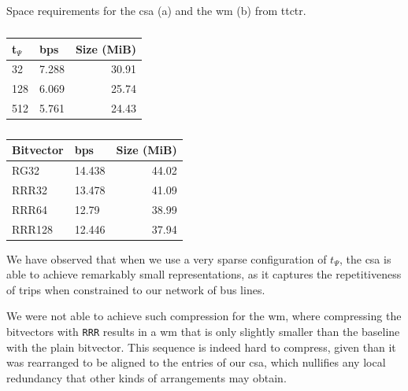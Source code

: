     \begin{table}[ht]
        \caption{Space requirements for the \acrlong{csa} (a) and the \acrlong{wm} (b) from \acrshort{ttctr}.}
        \label{tab:ttctr}
        \begin{subtable}[t]{.40\linewidth}
        \vspace{-12pt}
        \caption{}
        \begin{tabular}[t]{|l|l|r|}
            \hline
            t$_\Psi$ & bps & Size (MiB) \\
             \hline
            32 & 7.288 & 30.91 \\
            128 & 6.069 & 25.74 \\
            512 & 5.761 & 24.43 \\
            \hline
        \end{tabular}
        \end{subtable}%
        \begin{subtable}[t]{.40\linewidth}
        \vspace{-12pt}
        \caption{}
        \begin{tabular}[t]{|l|l|r|}
            \hline
            Bitvector & bps & Size (MiB) \\
             \hline
            RG32 & 14.438 & 44.02 \\
            RRR32 & 13.478 & 41.09 \\
            RRR64 & 12.79 & 38.99 \\
            RRR128 & 12.446 & 37.94 \\
            \hline
        \end{tabular}
        \end{subtable}
    \end{table}
    
    We have observed that when we use a very sparse configuration of $t_\Psi$, the \gls{csa} is able to achieve remarkably small representations, as it captures the repetitiveness of trips when constrained to our network of bus lines.
    
    We were not able to achieve such compression for the \gls{wm}, where compressing the bitvectors with \texttt{RRR} results in a \gls{wm} that is only slightly smaller than the baseline with the plain bitvector. This sequence is indeed hard to compress, given than it was rearranged to be aligned to the entries of our \gls{csa}, which nullifies any local redundancy that other kinds of arrangements may obtain.
    
